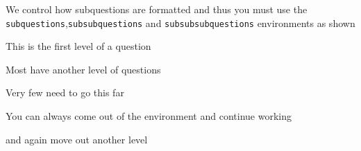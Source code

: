 We control how subquestions are formatted and thus you must use the
\texttt{subquestions},\texttt{subsubquestions} and \texttt{subsubsubquestions} environments as shown
\begin{subquestions}
   \subquestion This is the first level of a question
      \begin{subsubquestions}
         \subsubquestion Most have another level of questions
         \begin{subsubsubquestions}
            \subsubsubquestion Very few need to go this far
         \end{subsubsubquestions}
         \subsubquestion You can always come out of the environment and continue working
      \end{subsubquestions}
   \subquestion and again move out another level
\end{subquestions}